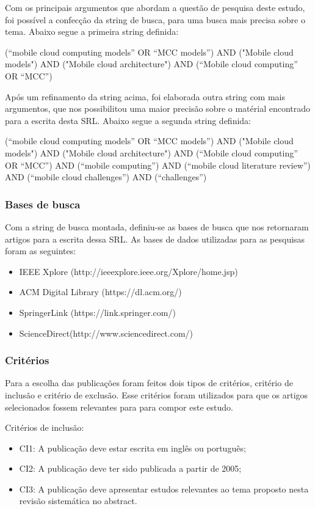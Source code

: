 \documentclass[12pt]{article}
\begin{document}
Com os principais argumentos que abordam a questão de pesquisa deste estudo, foi possível a confecção da string de busca,
para uma busca mais precisa sobre o tema. Abaixo segue a primeira string definida:

(“mobile cloud computing models” OR “MCC models”) AND ("Mobile cloud models") AND ("Mobile cloud architecture") AND (“Mobile
cloud computing” OR “MCC”)

Após um refinamento da string acima, foi elaborada outra string com mais argumentos, que nos possibilitou uma maior precisão
sobre o matérial encontrado
para a escrita desta SRL. Abaixo segue a segunda string definida:

(“mobile cloud computing models” OR “MCC models”) AND ("Mobile cloud models") AND ("Mobile cloud architecture") AND (“Mobile
cloud computing” OR “MCC”) AND (“mobile computing”) AND (“mobile cloud literature review”) AND (“mobile cloud challenges”) AND
(“challenges”)

\subsubsection{Bases de busca}

Com a string de busca montada, definiu-se as bases de busca que nos retornaram artigos para a escrita dessa SRL. As bases de
dados utilizadas para as pesquisas foram as seguintes:

\begin{itemize}
  \item IEEE Xplore (http://ieeexplore.ieee.org/Xplore/home.jsp)
  \item ACM Digital Library (https://dl.acm.org/)
  \item SpringerLink (https://link.springer.com/)
  \item ScienceDirect(http://www.sciencedirect.com/)
\end{itemize}

\subsubsection{Critérios}

Para a escolha das publicações foram feitos dois tipos de critérios, critério de inclusão e critério de exclusão.
Esse critérios foram utilizados para que os artigos selecionados fossem relevantes para para compor este estudo.

Critérios de inclusão:

\begin{itemize}
  \item CI1: A publicação deve estar escrita em inglês ou português;
  \item CI2: A publicação deve ter sido publicada a partir de 2005;
  \item CI3: A publicação deve apresentar estudos relevantes ao tema proposto nesta revisão sistemática no abstract.
\end{itemize}
\end{document}
